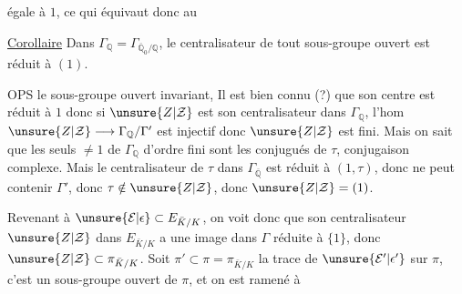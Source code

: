égale à $1$, ce qui équivaut donc au

\uline{Corollaire} Dans $\Gamma_{\mathbb Q}=\Gamma_{\overline{\mathbb Q}_0/\mathbb Q}$, le centralisateur de tout sous-groupe ouvert est réduit à $(1)$.

OPS le sous-groupe ouvert  invariant, Il est bien connu (?) que son centre est réduit à $1$
donc si $\unsure{Z|\mathcal Z}$ est son centralisateur dans $\Gamma_{\mathbb Q}$, l'hom $\unsure{Z|\mathcal Z}\longrightarrow\Gamma_{\mathbb Q}/\Gamma'$ est injectif donc $\unsure{Z|\mathcal Z}$ est fini. Mais on sait que les seuls  $\neq1$ de $\Gamma_{\mathbb Q}$ d'ordre fini sont les conjugués de $\tau$, conjugaison complexe. Mais le centralisateur de $\tau$ dans $\Gamma_{\overline{\mathbb Q}}$ est réduit à $(1,\tau)$, donc ne peut contenir $\Gamma'$, donc $\tau\notin\unsure{Z|\mathcal Z}$, donc $\unsure{Z|\mathcal Z}=(1)$.

Revenant à $\unsure{\mathcal E|\epsilon}\subset E_{\bar K/K}$, on voit donc que son centralisateur $\unsure{Z|\mathcal Z}$ dans $E_{\bar K/K}$ a une image dans $\Gamma$ réduite à $\{1\}$, donc $\unsure{Z|\mathcal Z}\subset\pi_{\bar K/K}$. Soit $\pi'\subset\pi=\pi_{\bar K/K}$ la trace de $\unsure{\mathcal E'|\epsilon'}$ sur $\pi$, c'est un sous-groupe ouvert de $\pi$, et on est ramené à
